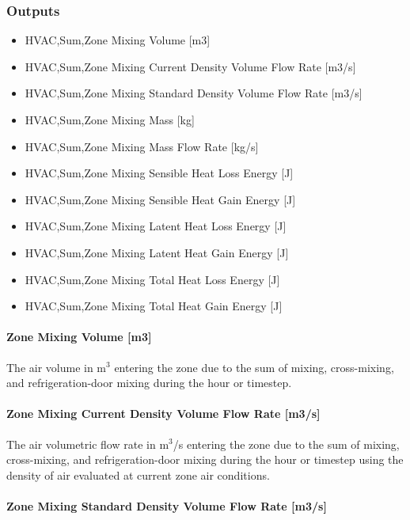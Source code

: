 \subsubsection{Outputs}\label{outputs-5-000}

\begin{itemize}
\item
  HVAC,Sum,Zone Mixing Volume {[}m3{]}
\item
  HVAC,Sum,Zone Mixing Current Density Volume Flow Rate {[}m3/s{]}
\item
  HVAC,Sum,Zone Mixing Standard Density Volume Flow Rate {[}m3/s{]}
\item
  HVAC,Sum,Zone Mixing Mass {[}kg{]}
\item
  HVAC,Sum,Zone Mixing Mass Flow Rate {[}kg/s{]}
\item
  HVAC,Sum,Zone Mixing Sensible Heat Loss Energy {[}J{]}
\item
  HVAC,Sum,Zone Mixing Sensible Heat Gain Energy {[}J{]}
\item
  HVAC,Sum,Zone Mixing Latent Heat Loss Energy {[}J{]}
\item
  HVAC,Sum,Zone Mixing Latent Heat Gain Energy {[}J{]}
\item
  HVAC,Sum,Zone Mixing Total Heat Loss Energy {[}J{]}
\item
  HVAC,Sum,Zone Mixing Total Heat Gain Energy {[}J{]}
\end{itemize}

\paragraph{Zone Mixing Volume {[}m3{]}}\label{zone-mixing-volume-m3-2}

The air volume in m\(^{3}\) entering the zone due to the sum of mixing, cross-mixing, and refrigeration-door mixing during the hour or timestep.

\paragraph{Zone Mixing Current Density Volume Flow Rate {[}m3/s{]}}\label{zone-mixing-current-density-volumetric-flow-rate-m3s-2}

The air volumetric flow rate in m\(^{3}\)/s entering the zone due to the sum of mixing, cross-mixing, and refrigeration-door mixing during the hour or timestep using the density of air evaluated at current zone air conditions.

\paragraph{Zone Mixing Standard Density Volume Flow Rate {[}m3/s{]}}\label{zone-mixing-standard-density-volumetric-flow-rate-m3s-2}

